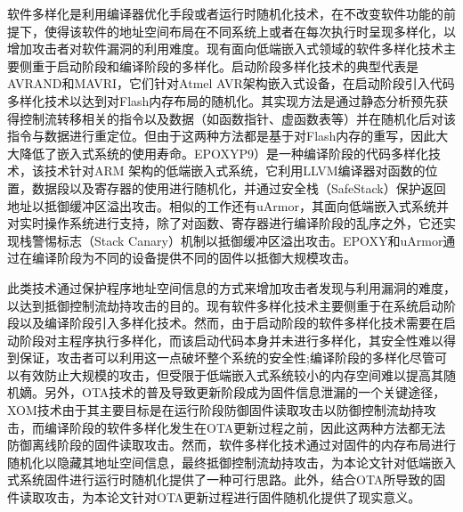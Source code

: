 \documentclass[12pt,a4paper]{ctexart}
\begin{document}
\par 软件多样化是利用编译器优化手段或者运行时随机化技术，在不改变软件功能的前提下，使得该软件的地址空间布局在不同系统上或者在每次执行时呈现多样化，以增加攻击者对软件漏洞的利用难度。现有面向低端嵌入式领域的软件多样化技术主要侧重于启动阶段和编译阶段的多样化。启动阶段多样化技术的典型代表是 AVRAND和MAVRI，它们针对Atmel AVR架构嵌入式设备，在启动阶段引入代码多样化技术以达到对Flash内存布局的随机化。其实现方法是通过静态分析预先获得控制流转移相关的指令以及数据（如函数指针、虚函数表等）并在随机化后对该指令与数据进行重定位。但由于这两种方法都是基于对Flash内存的重写，因此大大降低了嵌入式系统的使用寿命。EPOXYP9）是一种编译阶段的代码多样化技术，该技术针对ARM 架构的低端嵌入式系统，它利用LLVM编译器对函数的位置，数据段以及寄存器的使用进行随机化，并通过安全栈（SafeStack）保护返回地址以抵御缓冲区溢出攻击。相似的工作还有uArmor，其面向低端嵌入式系统并对实时操作系统进行支持，除了对函数、寄存器进行编译阶段的乱序之外，它还实现栈警惕标志（Stack Canary）机制以抵御缓冲区溢出攻击。EPOXY和uArmor通过在编译阶段为不同的设备提供不同的固件以抵御大规模攻击。
\par 此类技术通过保护程序地址空间信息的方式来增加攻击者发现与利用漏洞的难度，以达到抵御控制流劫持攻击的目的。现有软件多样化技术主要侧重于在系统启动阶段以及编译阶段引入多样化技术。然而，由于启动阶段的软件多样化技术需要在启动阶段对主程序执行多样化，而该启动代码本身并未进行多样化，其安全性难以得到保证，攻击者可以利用这一点破坏整个系统的安全性;编译阶段的多样化尽管可以有效防止大规模的攻击，但受限于低端嵌入式系统较小的内存空间难以提高其随机嫡。另外，OTA技术的普及导致更新阶段成为固件信息泄漏的一个关键途径，XOM技术由于其主要目标是在运行阶段防御固件读取攻击以防御控制流劫持攻击，而编译阶段的软件多样化发生在OTA更新过程之前，因此这两种方法都无法防御离线阶段的固件读取攻击。然而，软件多样化技术通过对固件的内存布局进行随机化以隐藏其地址空间信息，最终抵御控制流劫持攻击，为本论文针对低端嵌入式系统固件进行运行时随机化提供了一种可行思路。此外，结合OTA所导致的固件读取攻击，为本论文针对OTA更新过程进行固件随机化提供了现实意义。
\end{document}
